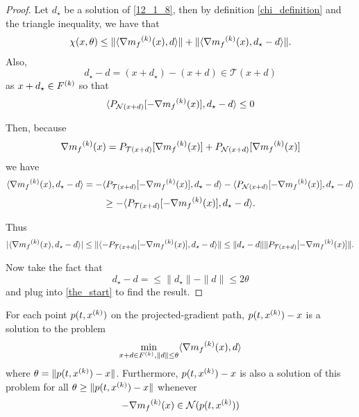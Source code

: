 \documentclass{article}
\begin{document}
\begin{proof}

Let $d_{\star}$ be a solution of \ref{12_1_8}, then by definition \ref{chi_definition} and the triangle inequality, we have that
\begin{align}
\label{the_start}
\chi(x, \theta)\le \|\langle\nabla{{m}_f}^{(k)}(x), d\rangle\| + \|\langle\nabla{{m}_f}^{(k)}(x), d_{\star} - d\rangle\|.
\end{align}
Also,
\[
d_{\star}-d = (x+d_{\star}) - (x+d) \in \mathcal T(x+d)
\]
as $x+d_{\star} \in {F}^{(k)}$ so that
\[
\langle P_{\mathcal N(x+d)}[-\nabla{{m}_f}^{(k)}(x)], d_{\star} - d\rangle \le 0
\]


Then, because
\[
\nabla{{m}_f}^{(k)}(x) = P_{\mathcal T(x+d)}[\nabla{{m}_f}^{(k)}(x)] + P_{\mathcal N(x+d)}[\nabla{{m}_f}^{(k)}(x)]
\]
we have
\[
\langle\nabla{{m}_f}^{(k)}(x), d_{\star} - d\rangle = -\langle P_{\mathcal T(x+d)}[-\nabla{{m}_f}^{(k)}(x)], d_{\star} - d\rangle - \langle P_{\mathcal N(x+d)}[-\nabla{{m}_f}^{(k)}(x)], d_{\star} - d\rangle
\]
\[
\ge -\langle P_{\mathcal T(x+d)}[-\nabla{{m}_f}^{(k)}(x)], d_{\star} - d\rangle.
\]

Thus
\[
|\langle\nabla{{m}_f}^{(k)}(x), d_{\star} - d\rangle| \le \|\langle -P_{\mathcal T(x+d)}[-\nabla{{m}_f}^{(k)}(x)], d_{\star} - d\rangle\| \le \|d_{\star} - d\|\|P_{\mathcal T(x+d)}[-\nabla{{m}_f}^{(k)}(x)]\|.
\]

Now take the fact that
\[
d_{\star} - d =\le \|d_{\star}\|-\|d\| \le 2\theta
\]
and plug into \ref{the_start} to find the result.
\end{proof}


\begin{theorem}
\label{12_1_4}
For each point $p(t,{x}^{(k)})$ on the projected-gradient path, $p(t,{x}^{(k)})-x$ is a solution to the problem
\begin{align}
\label{12_1_8}
\min_{x+d\in {F}^{(k)}, \|d\| \le \theta} \langle \nabla {{m}_f}^{(k)}(x), d\rangle
\end{align}
where $\theta = \|p(t,{x}^{(k)}) - x\|$.
Furthermore, $p(t,{x}^{(k)}) - x$ is also a solution of this problem for all $\theta \ge \|p(t,{x}^{(k)}) - x\|$ whenever
\begin{align}
\label{12_1_9}
-\nabla {{m}_f}^{(k)}(x) \in \mathcal N(p(t,{x}^{(k)}))
\end{align}
\end{theorem}
\end{document}
